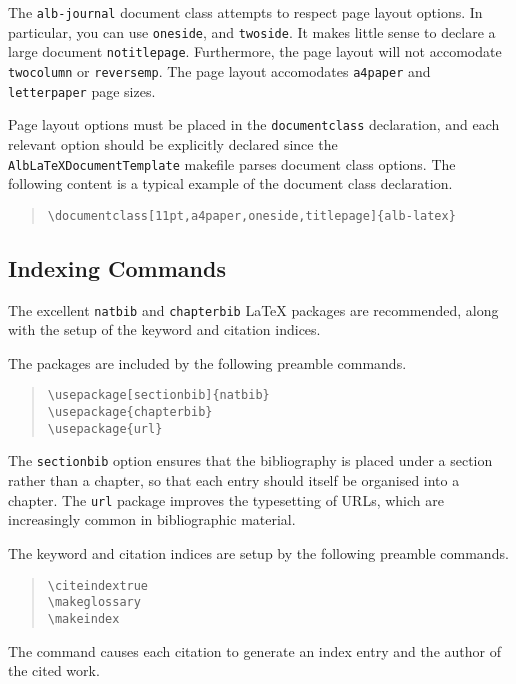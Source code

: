 \documentclass[11pt,a4paper,oneside,titlepage]{alb-latex}
\begin{document}
The \texttt{alb-journal} document class attempts to respect page layout
options.  In particular, you can use \texttt{oneside}, and
\texttt{twoside}.  It makes little sense to declare a large document
\texttt{notitlepage}.  Furthermore, the page layout will not accomodate
\texttt{twocolumn} or \texttt{reversemp}.  The page layout accomodates
\texttt{a4paper} and \texttt{letterpaper} page sizes.

Page layout options must be placed in the \texttt{documentclass}
declaration, and each relevant option should be explicitly declared
since the \texttt{AlbLaTeXDocumentTemplate} makefile parses document
class options.  The following content is a typical example of the
document class declaration.
\begin{quote}
\begin{verbatim}
\documentclass[11pt,a4paper,oneside,titlepage]{alb-latex}
\end{verbatim}
\end{quote}



\subsection{Indexing Commands}
\label{sec:alb-journal:index-comm}

The excellent \texttt{natbib} and \texttt{chapterbib} \LaTeX{} packages
are recommended, along with the setup of the keyword and citation
indices.

The packages are included by the following preamble commands.
\begin{quote}
\begin{verbatim}
\usepackage[sectionbib]{natbib}
\usepackage{chapterbib}
\usepackage{url}
\end{verbatim}
\end{quote}
The \texttt{sectionbib} option ensures that the bibliography is placed
under a section rather than a chapter, so that each entry should itself
be organised into a chapter.  The \texttt{url} package improves the
typesetting of URLs, which are increasingly common in bibliographic
material.

The keyword and citation indices are setup by the following preamble
commands.
\begin{quote}
\begin{verbatim}
\citeindextrue
\makeglossary
\makeindex
\end{verbatim}
\end{quote}
The  command causes each citation to generate
an index entry and the author of the cited work.
\end{document}
